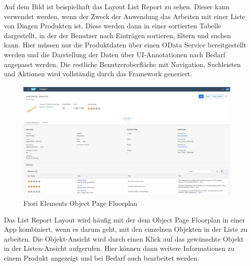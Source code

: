 Auf dem Bild ist beispielhaft das Layout List Report zu sehen. Dieser kann verwendet werden, wenn der Zweck der Anwendung das Arbeiten mit einer Liste von Dingen \zB Produkten ist. Diese werden dann in einer sortierten Tabelle dargestellt, in der der Benutzer nach Einträgen sortieren, filtern und suchen kann. Hier müssen nur die Produktdaten über einen OData Service bereitgestellt werden und die Darstellung der Daten über UI-Annotationen nach Bedarf angepasst werden. Die restliche Benutzeroberfläche mit Navigation, Suchleisten und Aktionen wird vollständig durch das Framework generiert. 

\begin{figure}[H]
    \centering
    \includegraphics[height=6cm]{Bilder/Fiori_Elements_Object_Floorplan.png}
    \caption[Fiori Elements Object Page Floorplan]{Fiori Elements Object Page Floorplan}
    \label{fig:iso_norm}
\end{figure}

Das List Report Layout wird häufig mit der dem Object Page Floorplan in einer App kombiniert, wenn es darum geht, mit den einzelnen Objekten in der Liste zu arbeiten. Die Objekt-Ansicht wird durch einen Klick auf das gewünschte Objekt in der Listen-Ansicht aufgerufen. Hier können dann weitere Informationen zu \zB einem Produkt angezeigt und bei Bedarf auch bearbeitet werden.